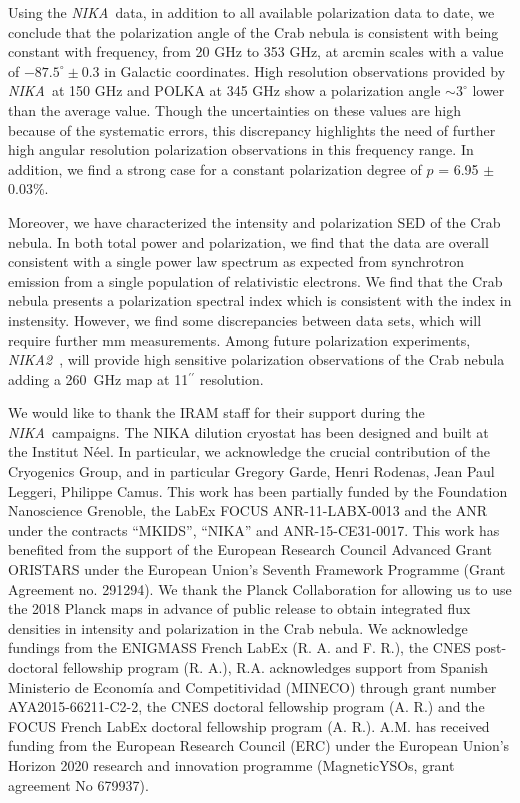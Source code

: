 \documentclass[twocolumn,traditabstract]{aa}
\def\NIKA{\textit{NIKA}}
\def\NIKAd{\textit{NIKA2}}
\begin{document}
Using the \NIKA\ data, in addition to all available polarization data to date, we conclude that the
polarization angle of the Crab nebula is consistent with being constant with
frequency, from 20 GHz to 353 GHz, at arcmin scales with a value of
$-87.5^{\circ}\pm0.3$ in Galactic coordinates. High resolution observations provided by \NIKA\ at 150 GHz and POLKA at 345 GHz show
a polarization angle $\sim 3^{\circ}$ lower than the average value. Though the uncertainties on these values are high because of the systematic errors, this discrepancy highlights the need of further high angular resolution polarization observations in this frequency range.
In addition, we find a strong case for a constant polarization degree of $p$ = 6.95 $\pm$ 0.03\%. 

Moreover, we have characterized the intensity and polarization SED of the Crab nebula. In both total power and polarization, we find that the data are overall consistent with a single power law spectrum as expected from synchrotron emission from a single population of relativistic electrons.
We find that the Crab nebula presents a polarization spectral index which is consistent with the index in instensity. 
However, we find some discrepancies between data sets, which will require further mm measurements. Among future polarization experiments, \NIKAd\ \citep{calvo2016}, will provide high sensitive polarization observations of the Crab nebula adding a 260~GHz map at 11$^{\prime\prime}$ resolution.



\vspace{0.2cm}
 \begin{acknowledgements}
We would like to thank the IRAM staff for their support during the \NIKA\ campaigns. 
The NIKA dilution cryostat has been designed and built at the Institut N\'eel. 
In particular, we acknowledge the crucial contribution of the Cryogenics Group, and 
in particular Gregory Garde, Henri Rodenas, Jean Paul Leggeri, Philippe Camus. 
This work has been partially funded by the Foundation Nanoscience Grenoble, the LabEx FOCUS ANR-11-LABX-0013 and 
the ANR under the contracts ``MKIDS'', ``NIKA'' and ANR-15-CE31-0017. 
This work has benefited from the support of the European Research Council Advanced Grant ORISTARS 
under the European Union's Seventh Framework Programme (Grant Agreement no. 291294).
We thank the Planck Collaboration for allowing us to use the 2018 Planck maps in advance of public release to obtain integrated flux densities in intensity and polarization in the Crab nebula. We acknowledge fundings from the ENIGMASS French LabEx (R. A. and F. R.), 
the CNES post-doctoral fellowship program (R. A.), R.A. acknowledges support from Spanish Ministerio de Econom\'ia and Competitividad (MINECO) through grant number AYA2015-66211-C2-2, the CNES doctoral fellowship program (A. R.) and
the FOCUS French LabEx doctoral fellowship program (A. R.).
A.M. has received funding from the European Research Council (ERC) under the European Union’s Horizon 2020 research and innovation programme (MagneticYSOs, grant agreement No 679937).
\end{acknowledgements}
\end{document}
